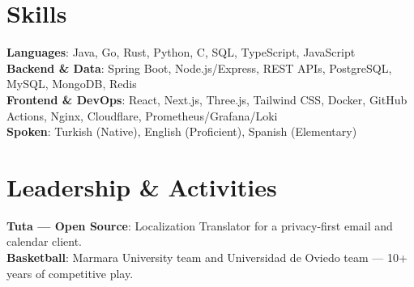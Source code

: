 \documentclass[a4paper,10pt]{article}
\begin{document}
\section{Skills}
  \begin{itemize}[leftmargin=0.15in, label={}, topsep=5pt]
    \small{\item{
      \textbf{Languages}{: Java, Go, Rust, Python, C, SQL, TypeScript, JavaScript} \\ \vspace{3pt}
      \textbf{Backend \& Data}{: Spring Boot, Node.js/Express, REST APIs, PostgreSQL, MySQL, MongoDB, Redis} \\ \vspace{3pt}
      \textbf{Frontend \& DevOps}{: React, Next.js, Three.js, Tailwind CSS, Docker, GitHub Actions, Nginx, Cloudflare, Prometheus/Grafana/Loki} \\ \vspace{3pt}
      \textbf{Spoken}{: Turkish (Native), English (Proficient), Spanish (Elementary)}
    }}
  \end{itemize}

\section{Leadership \& Activities}
  \begin{itemize}[leftmargin=0.15in, label={}, topsep=5pt]
    \small{\item{
      \textbf{Tuta --- Open Source}{: Localization Translator for a privacy-first email and calendar client.} \\ \vspace{3pt}
      \textbf{Basketball}{: Marmara University team and Universidad de Oviedo team --- 10+ years of competitive play.}
    }}
  \end{itemize}
\end{document}
